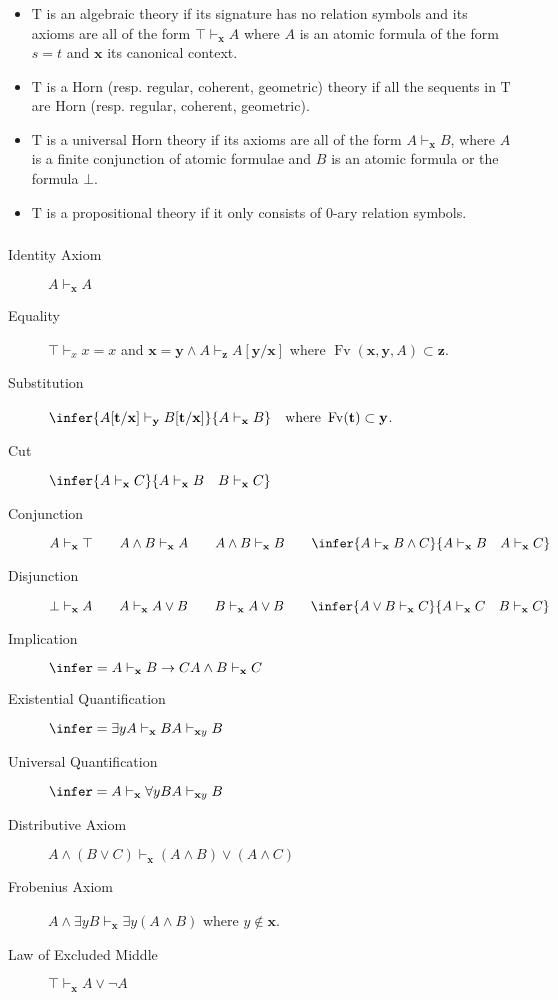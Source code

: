 \documentclass[UTF8,11pt,colorlinks,compress,openany]{beamer}%
\begin{document}
\begin{frame}\frametitle{}
\begin{itemize}
	\item $\mathrm{T}$ is an algebraic theory if its signature has no relation symbols and its axioms are all of the form $\top\vdash_{\mathbf{x}}A$ where $A$ is an atomic formula of the form $s=t$ and $\mathbf{x}$ its canonical context.
	\item $\mathrm{T}$ is a Horn (resp. regular, coherent, geometric) theory if all the sequents in $\mathrm{T}$ are Horn (resp. regular, coherent, geometric).
	\item $\mathrm{T}$ is a universal Horn theory if its axioms are all of the form $A\vdash_{\mathbf{x}}B$, where $A$ is a finite conjunction of atomic formulae and $B$ is an atomic formula or the formula $\bot$.
	\item $\mathrm{T}$ is a propositional theory if it only consists of $0$-ary relation symbols.
\end{itemize}
\end{frame}

\begin{frame}\frametitle{}
\begin{description}
	\item[Identity Axiom] $A\vdash_{\mathbf{x}}A$
	\item[Equality] $\top\vdash_x x=x$\;\; and\;\; $\mathbf{x}=\mathbf{y}\wedge A\vdash_{\mathbf{z}}A[\mathbf{y}/\mathbf{x}]$ where $\operatorname{Fv}(\mathbf{x},\mathbf{y},A)\subset\mathbf{z}$.
	\item[Substitution] $\infer{A[\mathbf{t}/\mathbf{x}]\vdash_{\mathbf{y}}B[\mathbf{t}/\mathbf{x}]}{A\vdash_{\mathbf{x}}B}\quad\mbox{where } \operatorname{Fv}(\mathbf{t})\subset\mathbf{y}$.
	\item[Cut] $\infer{A\vdash_{\mathbf{x}}C}{A\vdash_{\mathbf{x}}B\quad B\vdash_{\mathbf{x}}C}$
	\item[Conjunction] $A\vdash_{\mathbf{x}}\top\qquad A\wedge B\vdash_{\mathbf{x}}A\qquad A\wedge B\vdash_{\mathbf{x}}B\qquad\infer{A\vdash_{\mathbf{x}}B\wedge C}{A\vdash_{\mathbf{x}}B\quad A\vdash_{\mathbf{x}}C}$
	\item[Disjunction] $\bot\vdash_{\mathbf{x}}A\qquad A\vdash_{\mathbf{x}}A\vee B\qquad B\vdash_{\mathbf{x}}A\vee B\qquad\infer{A\vee B\vdash_{\mathbf{x}} C}{A\vdash_{\mathbf{x}} C\quad B\vdash_{\mathbf{x}} C}$
	\item[Implication] $\infer={A\vdash_{\mathbf{x}}B\to C}{A\wedge B\vdash_{\mathbf{x}}C}$
	\item[Existential Quantification] $\infer={\exists yA\vdash_{\mathbf{x}}B}{A\vdash_{\mathbf{x}y}B}$
	\item[Universal Quantification] $\infer={A\vdash_{\mathbf{x}}\forall yB}{A\vdash_{\mathbf{x}y}B}$
	\item[Distributive Axiom] $A\wedge(B\vee C)\vdash_{\mathbf{x}}(A\wedge B)\vee(A\wedge C)$
	\item[Frobenius Axiom] $A\wedge\exists yB\vdash_{\mathbf{x}} \exists y(A\wedge B)$ where $y\notin\mathbf{x}$.
	\item[Law of Excluded Middle] $\top\vdash_{\mathbf{x}}A\vee\neg A$
\end{description}
\end{frame}
\end{document}
